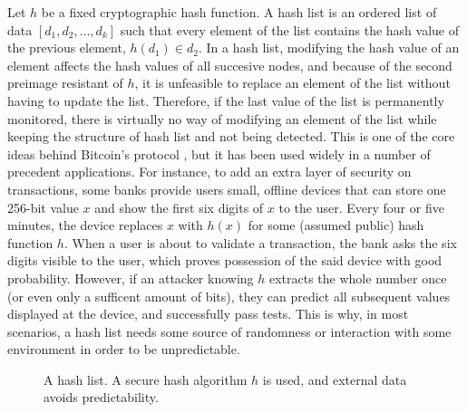 \medskip
{} 
Let $h$ be a fixed cryptographic hash function. A hash list is an ordered list of data $[d_1,d_2,\dots, d_k]$ such that every element of the list contains the hash value of the previous element, \ie $h(d_1)\in d_2$. In a hash list, modifying the hash value of an element affects the hash values of all succesive nodes, and because of the second preimage resistant of $h$, it is unfeasible to replace an element of the list without having to update the list. Therefore, if the last value of the list is permanently monitored, there is virtually no way of modifying an element of the list while keeping the structure of hash list and not being detected. This is one of the core ideas behind Bitcoin's protocol \cite{whitepaper}, but it has been used widely in a number of precedent applications.  For instance, to add an extra layer of security on transactions, some banks provide users small, offline devices that can store one 256-bit value $x$ and show the first six digits of $x$ to the user. Every four or five minutes, the device replaces $x$ with $h(x)$ for some (assumed public) hash function $h$. When a user is about to validate a transaction, the bank asks the six digits visible to the user, which proves possession of the said device with good probability. However, if an attacker knowing $h$ extracts the whole number once (or even only a sufficent amount of bits), they can predict all subsequent values displayed at the device, and successfully pass tests. This is why, in most scenarios, a hash list needs some source of randomness or interaction with some environment in order to be unpredictable.

\begin{figure}
\label{hashlist}
\centering
{}
\caption{A hash list. A secure hash algorithm $h$ is used, and external data avoids predictability.}
\end{figure}


